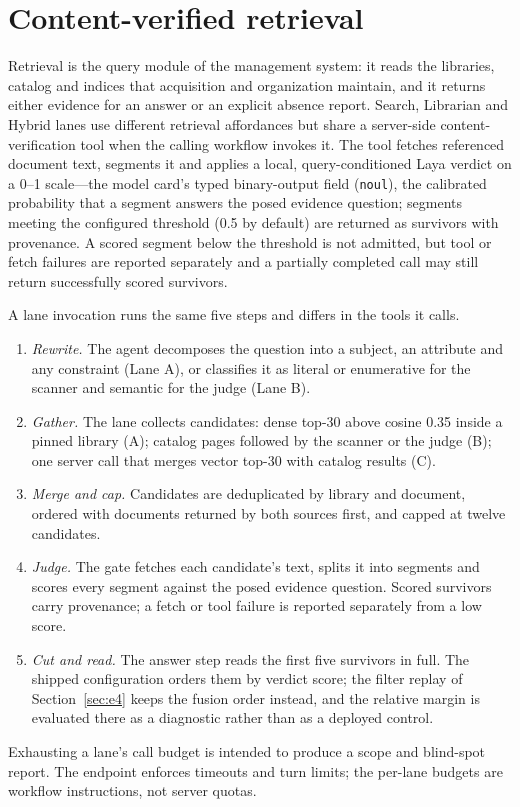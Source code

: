 \section{Content-verified retrieval}
\label{sec:retrieval}
\label{sec:lanes}

Retrieval is the query module of the management system: it reads the
libraries, catalog and indices that acquisition and organization maintain, and
it returns either evidence for an answer or an explicit absence report.
Search, Librarian and Hybrid lanes use different retrieval affordances but
share a server-side content-verification tool when the calling workflow invokes
it. The tool fetches referenced document text, segments it and applies a local,
query-conditioned Laya verdict on a 0--1 scale---the model card's typed
binary-output field (\texttt{noul}), the calibrated probability that a
segment answers the posed evidence question; segments meeting the configured
threshold (0.5 by default) are returned as survivors with provenance. A scored segment below the
threshold is not admitted, but tool or fetch failures are reported separately
and a partially completed call may still return successfully scored survivors.

A lane invocation runs the same five steps and differs in the tools it calls.
\begin{enumerate}
\item \emph{Rewrite.} The agent decomposes the question into a subject, an
attribute and any constraint (Lane A), or classifies it as literal or
enumerative for the scanner and semantic for the judge (Lane B).
\item \emph{Gather.} The lane collects candidates: dense top-30 above cosine
0.35 inside a pinned library (A); catalog pages followed by the scanner or the
judge (B); one server call that merges vector top-30 with catalog results (C).
\item \emph{Merge and cap.} Candidates are deduplicated by library and
document, ordered with documents returned by both sources first, and capped at
twelve candidates.
\item \emph{Judge.} The gate fetches each candidate's text, splits it into
segments and scores every segment against the posed evidence question. Scored
survivors carry provenance; a fetch or tool failure is reported separately from
a low score.
\item \emph{Cut and read.} The answer step reads the first five survivors in
full. The shipped configuration orders them by verdict score; the filter replay
of Section~\ref{sec:e4} keeps the fusion order instead, and the relative margin
is evaluated there as a diagnostic rather than as a deployed control.
\end{enumerate}
Exhausting a lane's call budget is intended to produce a scope and blind-spot
report. The endpoint enforces timeouts and turn limits; the per-lane budgets
are workflow instructions, not server quotas.

